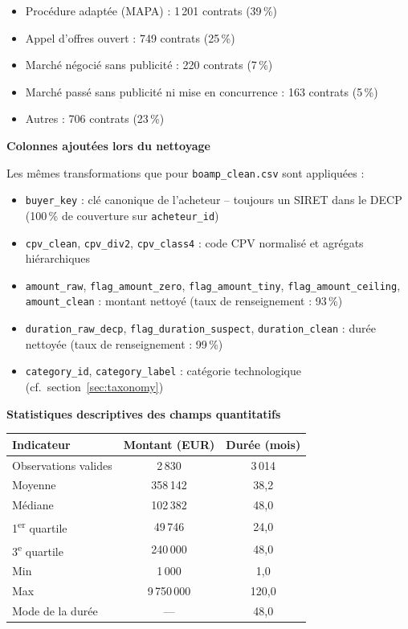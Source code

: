 \documentclass[12pt,a4paper]{article}
\begin{document}
\begin{itemize}
  \item[---] Procédure adaptée (MAPA) : 1\,201 contrats (39\,\%)
  \item[---] Appel d'offres ouvert : 749 contrats (25\,\%)
  \item[---] Marché négocié sans publicité : 220 contrats (7\,\%)
  \item[---] Marché passé sans publicité ni mise en concurrence : 163 contrats
    (5\,\%)
  \item[---] Autres : 706 contrats (23\,\%)
\end{itemize}

\medskip
\textbf{Colonnes ajoutées lors du nettoyage}

Les mêmes transformations que pour \texttt{boamp\_clean.csv} sont appliquées :

\begin{itemize}
  \item[---] \texttt{buyer\_key} : clé canonique de l'acheteur -- toujours un
    SIRET dans le DECP (100\,\% de couverture sur \texttt{acheteur\_id})
  \item[---] \texttt{cpv\_clean}, \texttt{cpv\_div2}, \texttt{cpv\_class4} :
    code CPV normalisé et agrégats hiérarchiques
  \item[---] \texttt{amount\_raw}, \texttt{flag\_amount\_zero},
    \texttt{flag\_amount\_tiny}, \texttt{flag\_amount\_ceiling},
    \texttt{amount\_clean} : montant nettoyé (taux de renseignement : 93\,\%)
  \item[---] \texttt{duration\_raw\_decp}, \texttt{flag\_duration\_suspect},
    \texttt{duration\_clean} : durée nettoyée (taux de renseignement : 99\,\%)
  \item[---] \texttt{category\_id}, \texttt{category\_label} : catégorie
    technologique (cf.\ section~\ref{sec:taxonomy})
\end{itemize}

\medskip
\textbf{Statistiques descriptives des champs quantitatifs}

\begin{center}
\begin{tabular}{lcc}
\toprule
\textbf{Indicateur} & \textbf{Montant (EUR)} &
  \textbf{Durée (mois)} \\
\midrule
Observations valides & 2\,830 & 3\,014 \\
Moyenne              & 358\,142 & 38,2 \\
Médiane              & 102\,382 & 48,0 \\
1\textsuperscript{er} quartile & 49\,746 & 24,0 \\
3\textsuperscript{e} quartile  & 240\,000 & 48,0 \\
Min                  & 1\,000     & 1,0 \\
Max                  & 9\,750\,000 & 120,0 \\
Mode de la durée     & ---      & 48,0 \\
\bottomrule
\end{tabular}
\end{center}
\end{document}
